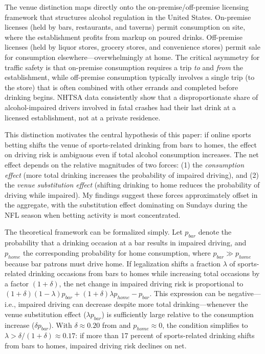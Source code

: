 \documentclass[12pt]{article}
\begin{document}
The venue distinction maps directly onto the on-premise/off-premise licensing framework that structures alcohol regulation in the United States. On-premise licenses (held by bars, restaurants, and taverns) permit consumption on site, where the establishment profits from markup on poured drinks. Off-premise licenses (held by liquor stores, grocery stores, and convenience stores) permit sale for consumption elsewhere---overwhelmingly at home. The critical asymmetry for traffic safety is that on-premise consumption requires a trip \emph{to} and \emph{from} the establishment, while off-premise consumption typically involves a single trip (to the store) that is often combined with other errands and completed before drinking begins. NHTSA data consistently show that a disproportionate share of alcohol-impaired drivers involved in fatal crashes had their last drink at a licensed establishment, not at a private residence.

This distinction motivates the central hypothesis of this paper: if online sports betting shifts the venue of sports-related drinking from bars to homes, the effect on driving risk is ambiguous even if total alcohol consumption increases. The net effect depends on the relative magnitudes of two forces: (1) the \emph{consumption effect} (more total drinking increases the probability of impaired driving), and (2) the \emph{venue substitution effect} (shifting drinking to home reduces the probability of driving while impaired). My findings suggest these forces approximately offset in the aggregate, with the substitution effect dominating on Sundays during the NFL season when betting activity is most concentrated.

The theoretical framework can be formalized simply. Let $p_{bar}$ denote the probability that a drinking occasion at a bar results in impaired driving, and $p_{home}$ the corresponding probability for home consumption, where $p_{bar} \gg p_{home}$ because bar patrons must drive home. If legalization shifts a fraction $\lambda$ of sports-related drinking occasions from bars to homes while increasing total occasions by a factor $(1 + \delta)$, the net change in impaired driving risk is proportional to $(1 + \delta)(1 - \lambda) p_{bar} + (1 + \delta)\lambda p_{home} - p_{bar}$. This expression can be negative---i.e., impaired driving can decrease despite more total drinking---whenever the venue substitution effect ($\lambda p_{bar}$) is sufficiently large relative to the consumption increase ($\delta p_{bar}$). With $\delta \approx 0.20$ from \citet{taylor2024betting} and $p_{home} \approx 0$, the condition simplifies to $\lambda > \delta / (1 + \delta) \approx 0.17$: if more than 17 percent of sports-related drinking shifts from bars to homes, impaired driving risk declines on net.
\end{document}

